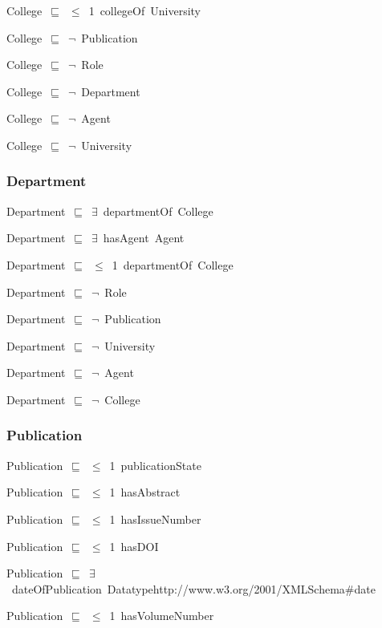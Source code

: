 \documentclass{article}
\begin{document}
College~\ensuremath{\sqsubseteq}~\ensuremath{\leq}~1~collegeOf~University~

College~\ensuremath{\sqsubseteq}~\ensuremath{\lnot}~Publication

College~\ensuremath{\sqsubseteq}~\ensuremath{\lnot}~Role

College~\ensuremath{\sqsubseteq}~\ensuremath{\lnot}~Department

College~\ensuremath{\sqsubseteq}~\ensuremath{\lnot}~Agent

College~\ensuremath{\sqsubseteq}~\ensuremath{\lnot}~University

\subsubsection*{Department}

Department~\ensuremath{\sqsubseteq}~\ensuremath{\exists}~departmentOf~College~

Department~\ensuremath{\sqsubseteq}~\ensuremath{\exists}~hasAgent~Agent~

Department~\ensuremath{\sqsubseteq}~\ensuremath{\leq}~1~departmentOf~College~

Department~\ensuremath{\sqsubseteq}~\ensuremath{\lnot}~Role

Department~\ensuremath{\sqsubseteq}~\ensuremath{\lnot}~Publication

Department~\ensuremath{\sqsubseteq}~\ensuremath{\lnot}~University

Department~\ensuremath{\sqsubseteq}~\ensuremath{\lnot}~Agent

Department~\ensuremath{\sqsubseteq}~\ensuremath{\lnot}~College

\subsubsection*{Publication}

Publication~\ensuremath{\sqsubseteq}~\ensuremath{\leq}~1~publicationState~

Publication~\ensuremath{\sqsubseteq}~\ensuremath{\leq}~1~hasAbstract~

Publication~\ensuremath{\sqsubseteq}~\ensuremath{\leq}~1~hasIssueNumber~

Publication~\ensuremath{\sqsubseteq}~\ensuremath{\leq}~1~hasDOI~

Publication~\ensuremath{\sqsubseteq}~\ensuremath{\exists}~dateOfPublication~Datatypehttp://www.w3.org/2001/XMLSchema#date~

Publication~\ensuremath{\sqsubseteq}~\ensuremath{\leq}~1~hasVolumeNumber~
\end{document}
